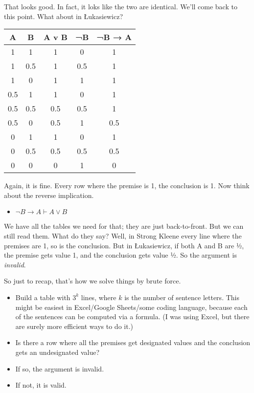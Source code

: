 \documentclass[
]{article}
\providecommand{\tightlist}{%
  \setlength{\itemsep}{0pt}\setlength{\parskip}{0pt}}\usepackage{longtable,booktabs,array}
\begin{document}
That looks good. In fact, it loks like the two are identical. We'll come
back to this point. What about in Łukasiewicz?

\begin{longtable}[]{@{}ccccc@{}}
\toprule()
A & B & A v B & ¬B & ¬B → A \\
\midrule()
\endhead
1 & 1 & 1 & 0 & 1 \\
1 & 0.5 & 1 & 0.5 & 1 \\
1 & 0 & 1 & 1 & 1 \\
0.5 & 1 & 1 & 0 & 1 \\
0.5 & 0.5 & 0.5 & 0.5 & 1 \\
0.5 & 0 & 0.5 & 1 & 0.5 \\
0 & 1 & 1 & 0 & 1 \\
0 & 0.5 & 0.5 & 0.5 & 0.5 \\
0 & 0 & 0 & 1 & 0 \\
\bottomrule()
\end{longtable}

Again, it is fine. Every row where the premise is 1, the conclusion is
1. Now think about the reverse implication.

\begin{itemize}
\tightlist
\item
  \(\neg B \rightarrow A \vdash A \vee B\)
\end{itemize}

We have all the tables we need for that; they are just back-to-front.
But we can still read them. What do they say? Well, in Strong Kleene
every line where the premises are 1, so is the conclusion. But in
Łukasiewicz, if both A and B are ½, the premise gets value 1, and the
conclusion gets value ½. So the argument is \emph{invalid}.

So just to recap, that's how we solve things by brute force.

\begin{itemize}
\tightlist
\item
  Build a table with \(3^k\) lines, where \(k\) is the number of
  sentence letters. This might be easiest in Excel/Google Sheets/some
  coding language, because each of the sentences can be computed via a
  formula. (I was using Excel, but there are surely more efficient ways
  to do it.)
\item
  Is there a row where all the premises get designated values and the
  conclusion gets an undesignated value?
\item
  If so, the argument is invalid.
\item
  If not, it is valid.
\end{itemize}
\end{document}
